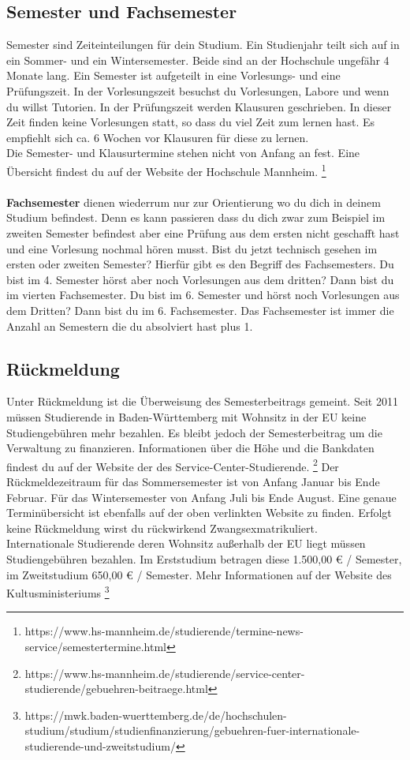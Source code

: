 \subsection*{Semester und Fachsemester}
Semester sind Zeiteinteilungen für dein Studium.
Ein Studienjahr teilt sich auf in ein Sommer- und ein Wintersemester.
Beide sind an der Hochschule ungefähr 4 Monate lang.
Ein Semester ist aufgeteilt in eine Vorlesungs- und eine Prüfungszeit.
In der Vorlesungszeit besuchst du Vorlesungen, Labore und wenn du willst Tutorien.
In der Prüfungszeit werden Klausuren geschrieben.
In dieser Zeit finden keine Vorlesungen statt, so dass du viel Zeit zum lernen hast.
Es empfiehlt sich ca. 6 Wochen vor Klausuren für diese zu lernen.
\\
Die Semester- und Klausurtermine stehen nicht von Anfang an fest.
Eine Übersicht findest du auf der Website der Hochschule Mannheim.
\footnote{https://www.hs-mannheim.de/studierende/termine-news-service/semestertermine.html}
\\\\
\textbf{Fachsemester} dienen wiederrum nur zur Orientierung wo du dich in deinem Studium befindest.
Denn es kann passieren dass du dich zwar zum Beispiel im zweiten Semester befindest aber eine Prüfung aus dem ersten nicht geschafft hast und eine Vorlesung nochmal hören musst.
Bist du jetzt technisch gesehen im ersten oder zweiten Semester?
Hierfür gibt es den Begriff des Fachsemesters.
Du bist im 4. Semester hörst aber noch Vorlesungen aus dem dritten?
Dann bist du im vierten Fachsemester.
Du bist im 6. Semester und hörst noch Vorlesungen aus dem Dritten?
Dann bist du im 6. Fachsemester.
Das Fachsemester ist immer die Anzahl an Semestern die du absolviert hast plus 1.

\subsection*{Rückmeldung}
Unter Rückmeldung ist die Überweisung des Semesterbeitrags gemeint.
Seit 2011 müssen Studierende in Baden-Württemberg mit Wohnsitz in der EU keine Studiengebühren mehr bezahlen.
Es bleibt jedoch der Semesterbeitrag um die Verwaltung zu finanzieren.
Informationen über die Höhe und die Bankdaten findest du auf der Website der des Service-Center-Studierende.
\footnote{https://www.hs-mannheim.de/studierende/service-center-studierende/gebuehren-beitraege.html}
Der Rückmeldezeitraum für das Sommersemester ist von Anfang Januar bis Ende Februar.
Für das Wintersemester von Anfang Juli bis Ende August.
Eine genaue Terminübersicht ist ebenfalls auf der oben verlinkten Website zu finden.
Erfolgt keine Rückmeldung wirst du rückwirkend Zwangsexmatrikuliert.
\\
Internationale Studierende deren Wohnsitz außerhalb der EU liegt müssen Studiengebühren bezahlen.
Im Erststudium betragen diese 1.500,00 € / Semester, im Zweitstudium 650,00 € / Semester.
Mehr Informationen auf der Website des Kultusministeriums \footnote{https://mwk.baden-wuerttemberg.de/de/hochschulen-studium/studium/studienfinanzierung/gebuehren-fuer-internationale-studierende-und-zweitstudium/}

